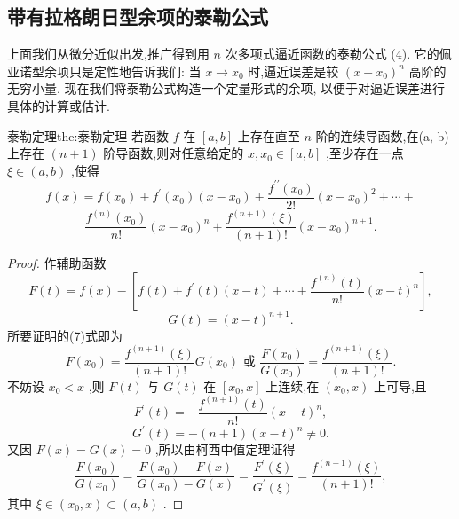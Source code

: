 \subsection{带有拉格朗日型余项的泰勒公式}

上面我们从微分近似出发,推广得到用 \(n\) 次多项式逼近函数的泰勒公式 (4). 它的佩亚诺型余项只是定性地告诉我们: 当 \(x \rightarrow  {x}_{0}\) 时,逼近误差是较 \({\left( x - {x}_{0}\right) }^{n}\) 高阶的无穷小量. 现在我们将泰勒公式构造一个定量形式的余项, 以便于对逼近误差进行具体的计算或估计.

\begin{theorem}{泰勒定理}{the:泰勒定理}
若函数 \(f\) 在 \(\left\lbrack  {a,b}\right\rbrack\) 上存在直至 \(n\) 阶的连续导函数,在(a, b) 上存在 \(\left( {n + 1}\right)\) 阶导函数,则对任意给定的 \(x,{x}_{0} \in  \left\lbrack  {a,b}\right\rbrack\) ,至少存在一点 \(\xi  \in  \left( {a,b}\right)\) ,使得
\[
f\left( x\right)  = f\left( {x}_{0}\right)  + {f}^{\prime }\left( {x}_{0}\right) \left( {x - {x}_{0}}\right)  + \frac{{f}^{\prime \prime }\left( {x}_{0}\right) }{2!}{\left( x - {x}_{0}\right) }^{2} + \cdots  +
\]
\[
\frac{{f}^{\left( n\right) }\left( {x}_{0}\right) }{n!}{\left( x - {x}_{0}\right) }^{n} + \frac{{f}^{\left( n + 1\right) }\left( \xi \right) }{\left( {n + 1}\right) !}{\left( x - {x}_{0}\right) }^{n + 1}. \tag{7}
\]
\end{theorem}

\begin{proof}
作辅助函数
\[
F\left( t\right)  = f\left( x\right)  - \left\lbrack  {f\left( t\right)  + {f}^{\prime }\left( t\right) \left( {x - t}\right)  + \cdots  + \frac{{f}^{\left( n\right) }\left( t\right) }{n!}{\left( x - t\right) }^{n}}\right\rbrack  ,
\]
\[
G\left( t\right)  = {\left( x - t\right) }^{n + 1}.
\]
所要证明的(7)式即为
\[
F\left( {x}_{0}\right)  = \frac{{f}^{\left( n + 1\right) }\left( \xi \right) }{\left( {n + 1}\right) !}G\left( {x}_{0}\right) \text{ 或 }\frac{F\left( {x}_{0}\right) }{G\left( {x}_{0}\right) } = \frac{{f}^{\left( n + 1\right) }\left( \xi \right) }{\left( {n + 1}\right) !}.
\]
不妨设 \({x}_{0} < x\) ,则 \(F\left( t\right)\) 与 \(G\left( t\right)\) 在 \(\left\lbrack  {{x}_{0},x}\right\rbrack\) 上连续,在 \(\left( {{x}_{0},x}\right)\) 上可导,且
\[
{F}^{\prime }\left( t\right)  =  - \frac{{f}^{\left( n + 1\right) }\left( t\right) }{n!}{\left( x - t\right) }^{n},
\]
\[
{G}^{\prime }\left( t\right)  =  - \left( {n + 1}\right) {\left( x - t\right) }^{n} \neq  0.
\]
又因 \(F\left( x\right)  = G\left( x\right)  = 0\) ,所以由柯西中值定理证得
\[
\frac{F\left( {x}_{0}\right) }{G\left( {x}_{0}\right) } = \frac{F\left( {x}_{0}\right)  - F\left( x\right) }{G\left( {x}_{0}\right)  - G\left( x\right) } = \frac{{F}^{\prime }\left( \xi \right) }{{G}^{\prime }\left( \xi \right) } = \frac{{f}^{\left( n + 1\right) }\left( \xi \right) }{\left( {n + 1}\right) !},
\]
其中 \(\xi  \in  \left( {{x}_{0},x}\right)  \subset  \left( {a,b}\right)\) .
\end{proof}


